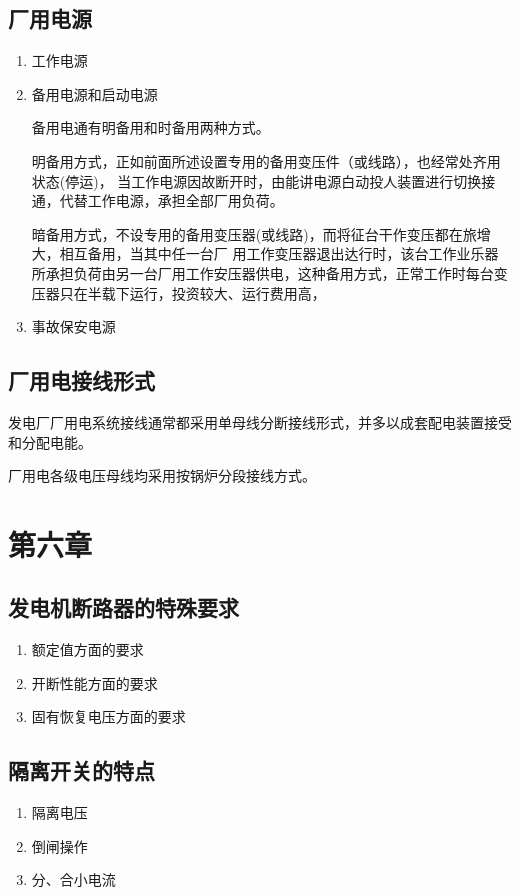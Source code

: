 \documentclass[UTF8]{ctexart}
\begin{document}
\subsection{厂用电源}
\begin{enumerate}[1]
    \item 工作电源
    \item 备用电源和启动电源
    \par \quad 备用电通有明备用和时备用两种方式。
    \par \qquad 明备用方式，正如前面所述设置专用的备用变压件（或线路），也经常处齐用状态(停运)， 当工作电源因故断开时，由能讲电源白动投人装置进行切换接通，代替工作电源，承担全部厂用负荷。
    \par \qquad 暗备用方式，不设专用的备用变压器(或线路)，而将征台干作变压都在旅增大，相互备用，当其中任一台厂 用工作变压器退出达行时，该台工作业乐器所承担负荷由另一台厂用工作安压器供电，这种备用方式，正常工作时每台变压器只在半载下运行，投资较大、运行费用高，
    \item 事故保安电源  
\end{enumerate}
\subsection{厂用电接线形式}
\par 发电厂厂用电系统接线通常都采用单母线分断接线形式，并多以成套配电装置接受和分配电能。
\par 厂用电各级电压母线均采用按锅炉分段接线方式。
\section{第六章}
\subsection{发电机断路器的特殊要求}
\begin{enumerate}[(1)]
    \item 额定值方面的要求
    \item 开断性能方面的要求
    \item 固有恢复电压方面的要求
\end{enumerate}
\subsection{隔离开关的特点}
\begin{enumerate}[(1)]
    \item 隔离电压
    \item 倒闸操作
    \item 分、合小电流
\end{enumerate}
\end{document}
